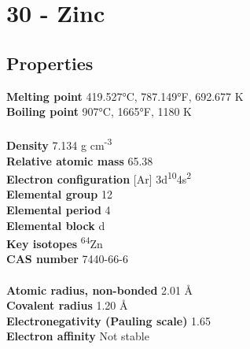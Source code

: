 \section{30 - Zinc}
\label{sec:elem-zinc}
\subsection{Properties}
\textbf{Melting point} 419.527°C, 787.149°F, 692.677 K\\
\textbf{Boiling point} 907°C, 1665°F, 1180 K\\
\\
\textbf{Density} 7.134 g cm\textsuperscript{-3}\\
\textbf{Relative atomic mass} 65.38\\
\textbf{Electron configuration} [Ar] 3d\textsuperscript{10}4s\textsuperscript{2}\\
\textbf{Elemental group} 12\\
\textbf{Elemental period} 4\\
\textbf{Elemental block} d\\
\textbf{Key isotopes} \textsuperscript{64}Zn\\
\textbf{CAS number} 7440-66-6\\
\\
\textbf{Atomic radius, non-bonded} 2.01 Å\\
\textbf{Covalent radius} 1.20 Å\\
\textbf{Electronegativity (Pauling scale)} 1.65\\
\textbf{Electron affinity} Not stable\\